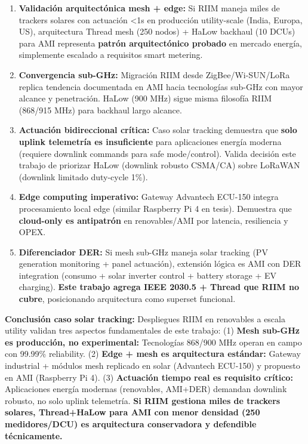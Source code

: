 \begin{enumerate}
    \item \textbf{Validación arquitectónica mesh + edge:} Si RIIM maneja miles de trackers solares con actuación <1s en producción utility-scale (India, Europa, US), arquitectura Thread mesh (250 nodos) + HaLow backhaul (10 DCUs) para AMI representa \textbf{patrón arquitectónico probado} en mercado energía, simplemente escalado a requisitos smart metering.
    
    \item \textbf{Convergencia sub-GHz:} Migración RIIM desde ZigBee/Wi-SUN/LoRa replica tendencia documentada en AMI hacia tecnologías sub-GHz con mayor alcance y penetración. HaLow (900 MHz) sigue misma filosofía RIIM (868/915 MHz) para backhaul largo alcance.
    
    \item \textbf{Actuación bidireccional crítica:} Caso solar tracking demuestra que \textbf{solo uplink telemetría es insuficiente} para aplicaciones energía moderna (requiere downlink commands para safe mode/control). Valida decisión este trabajo de priorizar HaLow (downlink robusto CSMA/CA) sobre LoRaWAN (downlink limitado duty-cycle 1\%).
    
    \item \textbf{Edge computing imperativo:} Gateway Advantech ECU-150 integra procesamiento local edge (similar Raspberry Pi 4 en tesis). Demuestra que \textbf{cloud-only es antipatrón} en renovables/AMI por latencia, resiliencia y OPEX.
    
    \item \textbf{Diferenciador DER:} Si mesh sub-GHz maneja solar tracking (PV generation monitoring + panel actuación), extensión lógica es AMI con DER integration (consumo + solar inverter control + battery storage + EV charging). \textbf{Este trabajo agrega IEEE 2030.5 + Thread que RIIM no cubre}, posicionando arquitectura como superset funcional.
\end{enumerate}

\textbf{Conclusión caso solar tracking:} Despliegues RIIM en renovables a escala utility validan tres aspectos fundamentales de este trabajo: (1) \textbf{Mesh sub-GHz es producción, no experimental:} Tecnologías 868/900 MHz operan en campo con 99.99\% reliability. (2) \textbf{Edge + mesh es arquitectura estándar:} Gateway industrial + módulos mesh replicado en solar (Advantech ECU-150) y propuesto en AMI (Raspberry Pi 4). (3) \textbf{Actuación tiempo real es requisito crítico:} Aplicaciones energía modernas (renovables, AMI+DER) demandan downlink robusto, no solo uplink telemetría. \textbf{Si RIIM gestiona miles de trackers solares, Thread+HaLow para AMI con menor densidad (250 medidores/DCU) es arquitectura conservadora y defendible técnicamente.}

